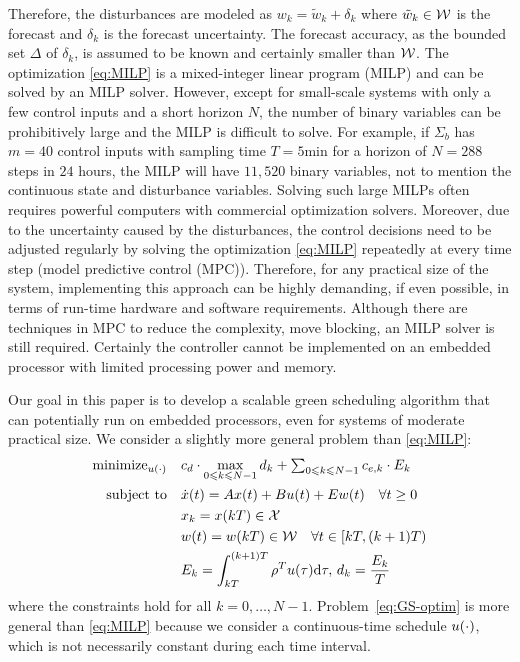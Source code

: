 Therefore, the disturbances are modeled as $w_{k} = \tilde{w}_{k} + \delta_{k}$ where $\tilde{w}_{k} \in \mathcal{W}$ is the forecast and $\delta_{k}$ is the forecast uncertainty.
The forecast accuracy, as the bounded set $\Delta$ of $\delta_{k}$, is assumed to be known and certainly smaller than $\mathcal{W}$.
The optimization \eqref{eq:MILP} is a mixed-integer linear program (MILP) and can be solved by an MILP solver.
However, except for small-scale systems with only a few control inputs and a short horizon $N$, the number of binary variables can be prohibitively large and the MILP is difficult to solve.
For example, if $\Sigma_b$ has $m=40$ control inputs with sampling time $T = 5 \text{min}$ for a horizon of $N = 288$ steps in $24$ hours, the MILP will have $11 \comma 520$ binary variables, not to mention the continuous state and disturbance variables.
Solving such large MILPs often requires powerful computers with commercial optimization
solvers.
Moreover, due to the uncertainty caused by the disturbances, the control decisions need to be adjusted regularly by solving the optimization \eqref{eq:MILP} repeatedly at every time step (model predictive control (MPC)).
Therefore, for any practical size of the system, implementing this approach can be highly demanding, if even possible, in terms of run-time hardware and software requirements.
Although there are techniques in MPC to reduce the complexity, \eg move blocking, an MILP solver is still required.
Certainly the controller cannot be implemented on an embedded processor with limited processing power and memory.


Our goal in this paper is to develop a scalable green scheduling algorithm that can potentially run on embedded processors, even for systems of moderate practical size.
We consider a slightly more general problem than \eqref{eq:MILP}:
\begin{align}
  \operatorname{minimize}_{u (\cdot)} \quad & c_d \cdot \max_{0 \leqslant k \leqslant
  N - 1} d_k + \textstyle\sum_{0 \leqslant k \leqslant N - 1} c_{e, k} \cdot E_k 
  \label{eq:GS-optim}\\
  \text{subject to} \quad
  & \dot{x} (t) = Ax (t) + Bu (t) + Ew (t) \quad \forall t \geq 0 \nonumber\\
  & x_{k} = x (kT) \in \mathcal{X} \nonumber\\
  & w (t) = w (kT) \in \mathcal{W} \quad \forall t \in [kT, (k + 1)
  T) \nonumber\\
  & E_k = \int_{kT}^{(k + 1) T} \rho^{T} u(\tau) \mathrm{d} \tau, \, d_k = \frac{E_k}{T} \nonumber
\end{align}
where the constraints hold for all $k = 0, \ldots, N - 1$.
Problem~\eqref{eq:GS-optim} is more general than \eqref{eq:MILP} because we consider a
continuous-time schedule $u (\cdot)$, which is not necessarily constant
during each time interval.



